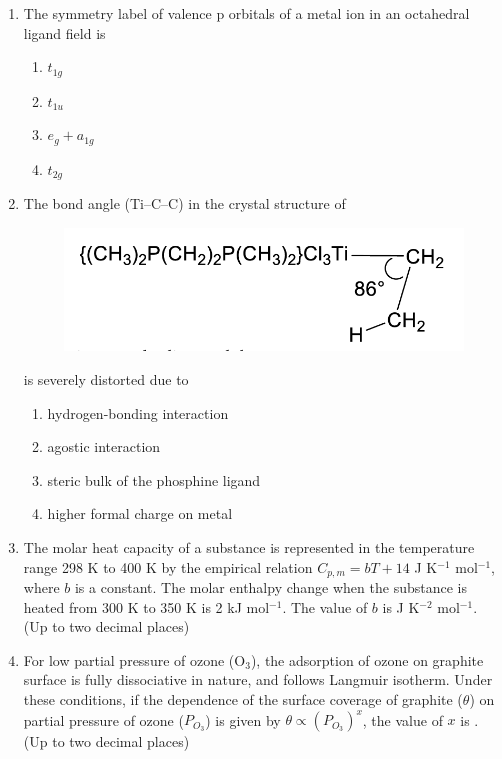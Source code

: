\documentclass{article}
\begin{document}
\begin{enumerate}
\item The symmetry label of valence p orbitals of a metal ion in an octahedral ligand field is
\begin{multicols}{4}
\begin{enumerate}
    \item $t_{1g}$
    \item $t_{1u}$
    \item $e_g + a_{1g}$
    \item $t_{2g}$
\end{enumerate}
\end{multicols}

\item The bond angle (Ti–C–C) in the crystal structure of \\

\begin{figure}[H]
    \centering
    \includegraphics[width=0.5\columnwidth]{figures/cy_q17.png}
    \label{fig:placeholder}
\end{figure}
is severely distorted due to
\begin{multicols}{2}
\begin{enumerate}
    \item hydrogen-bonding interaction
    \item agostic interaction
    \item steric bulk of the phosphine ligand
    \item higher formal charge on metal
\end{enumerate}
\end{multicols}

\item The molar heat capacity of a substance is represented in the temperature range 298 K to 
400 K by the empirical relation $C_{p,m} = bT + 14$ J K$^{-1}$ mol$^{-1}$, where $b$ is a constant.  
The molar enthalpy change when the substance is heated from 300 K to 350 K is 2 kJ mol$^{-1}$.  
The value of $b$ is \underline{\hspace{2cm}} J K$^{-2}$ mol$^{-1}$. (Up to two decimal places)

\item For low partial pressure of ozone (O$_3$), the adsorption of ozone on graphite surface is fully 
dissociative in nature, and follows Langmuir isotherm. Under these conditions, if the 
dependence of the surface coverage of graphite ($\theta$) on partial pressure of ozone ($P_{O_3}$) is 
given by $\theta \propto (P_{O_3})^x$, the value of $x$ is \underline{\hspace{2cm}}. (Up to two decimal places)


\end{enumerate}
\end{document}
